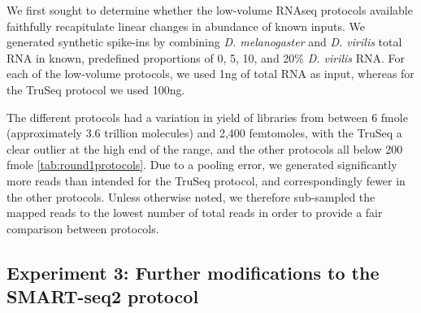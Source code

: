 We first sought to determine whether the low-volume RNAseq protocols available faithfully recapitulate linear changes in abundance of known inputs. We generated synthetic spike-ins by combining {\em D. melanogaster} and {\em D. virilis} total RNA in known, predefined proportions of 0, 5, 10, and 20\% {\em D. virilis} RNA. For each of the low-volume protocols, we used 1ng of total RNA as input, whereas for the TruSeq protocol we used 100ng.

The different protocols had a variation in yield of libraries from between 6 fmole (approximately 3.6 trillion molecules) and 2,400 femtomoles, with the TruSeq a clear outlier at the high end of the range, and the other protocols all below 200 fmole \ref{tab:round1protocols}.  Due to a pooling error, we generated significantly more reads than intended for the TruSeq protocol, and correspondingly fewer in the other protocols. Unless otherwise noted, we therefore sub-sampled the mapped reads to the lowest number of total reads in order to provide a fair comparison between protocols. 


\subsection{Experiment 3: Further modifications to the SMART-seq2 protocol}

